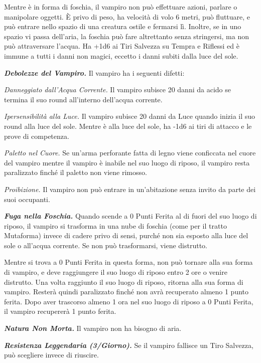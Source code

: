 \begin{multicols}{2}
	Mentre è in forma di foschia, il vampiro non può effettuare azioni, parlare o manipolare oggetti. È privo di peso, ha velocità di volo 6 metri, può fluttuare, e può entrare nello spazio di una creatura ostile e fermarsi lì. Inoltre, se in uno spazio vi passa dell'aria, la foschia può fare altrettanto senza stringersi, ma non può attraversare l'acqua. Ha +1d6 ai Tiri Salvezza su Tempra e Riflessi ed è immune a tutti i danni non magici, eccetto i danni subiti dalla luce del
	sole.

	\textit{\textbf{Debolezze del Vampiro.}} Il vampiro ha i seguenti difetti:

	\textit{Danneggiato dall'Acqua Corrente.} Il vampiro subisce 20 danni da acido se termina il suo round all'interno dell'acqua corrente.

	\textit{Ipersensibilità alla Luce.} Il vampiro subisce 20 danni da Luce quando inizia il suo round alla luce del sole. Mentre è alla luce del sole, ha -1d6 ai tiri di attacco e le prove di competenza.

	\textit{Paletto nel Cuore.} Se un'arma perforante fatta di legno viene conficcata nel cuore del vampiro mentre il vampiro è inabile nel suo luogo di riposo, il vampiro resta paralizzato finché il paletto non viene rimosso.

	\textit{Proibizione.} Il vampiro non può entrare in un'abitazione senza invito da parte dei suoi occupanti.

	\textit{\textbf{Fuga nella Foschia.}} Quando scende a 0 Punti Ferita al di fuori del suo luogo di riposo, il vampiro si trasforma in una nube di foschia (come per il tratto Mutaforma) invece di cadere privo di sensi, purché non sia esposto alla luce del sole o all'acqua corrente. Se non può trasformarsi, viene distrutto.

	Mentre si trova a 0 Punti Ferita in questa forma, non può tornare alla sua forma di vampiro, e deve raggiungere il suo luogo di riposo entro 2 ore o venire distrutto. Una volta raggiunto il suo luogo di riposo, ritorna alla sua forma di vampiro. Resterà quindi paralizzato finché non avrà recuperato almeno 1 punto ferita. Dopo aver trascorso almeno 1 ora nel suo luogo di riposo a 0 Punti Ferita, il vampiro recupererà 1 punto ferita.

	\textit{\textbf{Natura Non Morta.}} Il vampiro non ha bisogno di aria.

	\textit{\textbf{Resistenza Leggendaria (3/Giorno).}} Se il vampiro fallisce un Tiro Salvezza, può scegliere invece di riuscire.


\end{multicols}
